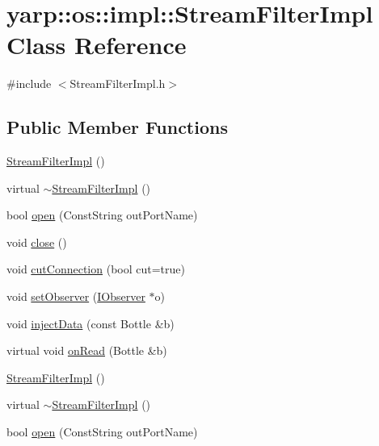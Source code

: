 \hypertarget{classyarp_1_1os_1_1impl_1_1_stream_filter_impl}{
\section{yarp::os::impl::StreamFilterImpl Class Reference}
\label{classyarp_1_1os_1_1impl_1_1_stream_filter_impl}
}


{\ttfamily \#include $<$StreamFilterImpl.h$>$}\subsection*{Public Member Functions}
\begin{DoxyCompactItemize}
\item 
\hyperlink{classyarp_1_1os_1_1impl_1_1_stream_filter_impl_a34b63ca7d32244a7c0ec974ce7d3c2f2}{StreamFilterImpl} ()
\item 
virtual \hyperlink{classyarp_1_1os_1_1impl_1_1_stream_filter_impl_a57728d60fe69bb2946135cbc817e6400}{$\sim$StreamFilterImpl} ()
\item 
bool \hyperlink{classyarp_1_1os_1_1impl_1_1_stream_filter_impl_a89e921dc1fa47bc6136bc3135e89ae03}{open} (ConstString outPortName)
\item 
void \hyperlink{classyarp_1_1os_1_1impl_1_1_stream_filter_impl_afe2c98307b0051805788c690b160b977}{close} ()
\item 
void \hyperlink{classyarp_1_1os_1_1impl_1_1_stream_filter_impl_a9a7a37fe9ac8b71cc7a6a54a118617fc}{cutConnection} (bool cut=true)
\item 
void \hyperlink{classyarp_1_1os_1_1impl_1_1_stream_filter_impl_a269889b1cdc1992968861e49d7542e5d}{setObserver} (\hyperlink{classyarp_1_1os_1_1_i_observer}{IObserver} $\ast$o)
\item 
void \hyperlink{classyarp_1_1os_1_1impl_1_1_stream_filter_impl_a114406a0f5eb4ae4c002a76f998e89b2}{injectData} (const Bottle \&b)
\item 
virtual void \hyperlink{classyarp_1_1os_1_1impl_1_1_stream_filter_impl_a9ffe25ea43e69bcc50d3334fea26fff5}{onRead} (Bottle \&b)
\item 
\hyperlink{classyarp_1_1os_1_1impl_1_1_stream_filter_impl_a9db10175fac8a0e45ecdc03c2c57a5be}{StreamFilterImpl} ()
\item 
virtual \hyperlink{classyarp_1_1os_1_1impl_1_1_stream_filter_impl_aa7fa903f6a608c621e892a21f0c0c4eb}{$\sim$StreamFilterImpl} ()
\item 
bool \hyperlink{classyarp_1_1os_1_1impl_1_1_stream_filter_impl_addabbbd78373c7aa7e4712776064891e}{open} (ConstString outPortName)

\end{DoxyCompactItemize}
